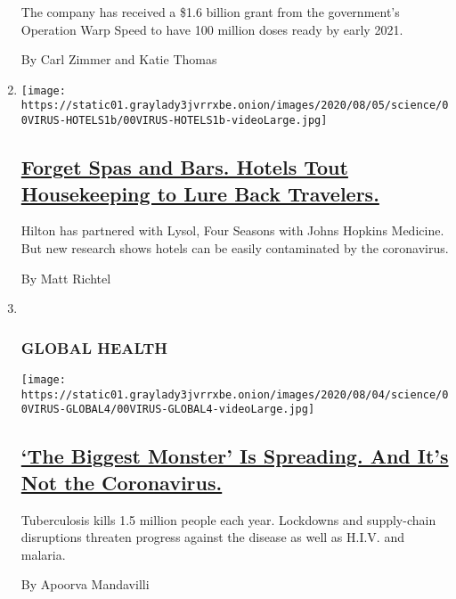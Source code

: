 \begin{enumerate}
  The company has received a \$1.6 billion grant from the government's
  Operation Warp Speed to have 100 million doses ready by early 2021.

  By Carl Zimmer and Katie Thomas
\item
  \texttt{[image: https://static01.graylady3jvrrxbe.onion/images/2020/08/05/science/00VIRUS-HOTELS1b/00VIRUS-HOTELS1b-videoLarge.jpg]}

  \hypertarget{forget-spas-and-bars-hotels-tout-housekeeping-to-lure-back-travelers}{%
  \subsection{\texorpdfstring{\href{/2020/08/04/health/coronavirus-hotels-infect.html}{Forget
  Spas and Bars. Hotels Tout Housekeeping to Lure Back
  Travelers.}}{Forget Spas and Bars. Hotels Tout Housekeeping to Lure Back Travelers.}}\label{forget-spas-and-bars-hotels-tout-housekeeping-to-lure-back-travelers}}

  Hilton has partnered with Lysol, Four Seasons with Johns Hopkins
  Medicine. But new research shows hotels can be easily contaminated by
  the coronavirus.

  By Matt Richtel
\item ~
  \hypertarget{global-health}{%
  \subsubsection{GLOBAL HEALTH}\label{global-health}}

  \texttt{[image: https://static01.graylady3jvrrxbe.onion/images/2020/08/04/science/00VIRUS-GLOBAL4/00VIRUS-GLOBAL4-videoLarge.jpg]}

  \hypertarget{the-biggest-monster-is-spreading-and-its-not-the-coronavirus}{%
  \subsection{\texorpdfstring{\href{/2020/08/03/health/coronavirus-tuberculosis-aids-malaria.html}{`The
  Biggest Monster' Is Spreading. And It's Not the
  Coronavirus.}}{`The Biggest Monster' Is Spreading. And It's Not the Coronavirus.}}\label{the-biggest-monster-is-spreading-and-its-not-the-coronavirus}}

  Tuberculosis kills 1.5 million people each year. Lockdowns and
  supply-chain disruptions threaten progress against the disease as well
  as H.I.V. and malaria.

  By Apoorva Mandavilli
\end{enumerate}

